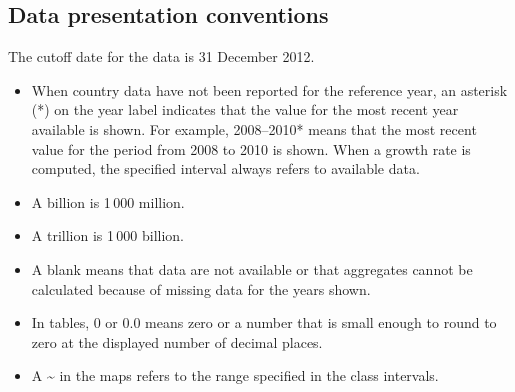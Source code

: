 \subsection{Data presentation conventions}

The cutoff date for the data is 31 December 2012.

\begin{itemize}

\item  When country data have not been reported for the reference year, an asterisk (*) on the year label indicates that the value for the most recent year available is shown. For example, 2008–2010* means that the most recent value for the period from 2008 to 2010 is shown. When a growth rate is computed, the specified interval always refers to available data.

\item A billion is 1\,000 million.

\item A trillion is 1\,000 billion.

\item A blank means that data are not available or that aggregates cannot be calculated because of missing data for the years shown.

\item In tables, 0 or 0.0 means zero or a number that is small enough to round to zero at the displayed number of decimal places.

\item  A \textasciitilde{} in the maps refers to the range specified in the class intervals.

\end{itemize}

